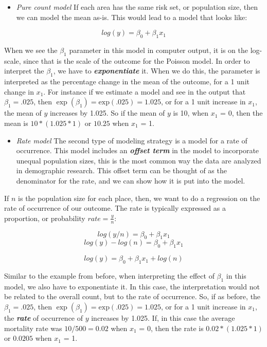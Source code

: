 \documentclass[
]{article}
\providecommand{\tightlist}{%
  \setlength{\itemsep}{0pt}\setlength{\parskip}{0pt}}
\begin{document}
\begin{itemize}
\tightlist
\item
  \emph{Pure count model} If each area has the same risk set, or population size, then we can model the mean as-is. This would lead to a model that looks like:
\end{itemize}

\[log(y)= \beta_0 + \beta_1 x_1\]

When we see the \(\beta_1\) parameter in this model in computer output, it is on the log-scale, since that is the scale of the outcome for the Poisson model. In order to interpret the \(\beta_1\), we have to \textbf{\emph{exponentiate}} it. When we do this, the parameter is interpreted as the percentage change in the mean of the outcome, for a 1 unit change in \(x_1\). For instance if we estimate a model and see in the output that \(\beta_1 = \text{.025}\), then \(\exp(\beta_1) = \text{exp}(\text{.025}) = \text{1.025}\), or for a 1 unit increase in \(x_1\), the mean of \(y\) increases by 1.025. So if the mean of \(y\) is 10, when \(x_1\) = 0, then the mean is \(10*(1.025*1)\) or \(10.25\) when \(x_1\) = 1.

\begin{itemize}
\tightlist
\item
  \emph{Rate model} The second type of modeling strategy is a model for a rate of occurrence. This model includes an \textbf{\emph{offset term}} in the model to incorporate unequal population sizes, this is the most common way the data are analyzed in demographic research. This offset term can be thought of as the denominator for the rate, and we can show how it is put into the model.
\end{itemize}

If \(n\) is the population size for each place, then, we want to do a regression on the rate of occurrence of our outcome. The rate is typically expressed as a proportion, or probability \(rate = \frac{y}{n}\):

\[log(y/n)= \beta_0 + \beta_1 x_1\] \[log(y) - log(n)= \beta_0 + \beta_1 x_1\]

\[log(y)= \beta_0 + \beta_1 x_1 + log(n)\]

Similar to the example from before, when interpreting the effect of \(\beta_1\) in this model, we also have to exponentiate it. In this case, the interpretation would not be related to the overall count, but to the rate of occurrence. So, if as before, the \(\beta_1 = \text{.025}\), then \(\exp(\beta_1) = \text{exp}(\text{.025}) = \text{1.025}\), or for a 1 unit increase in \(x_1\), the \textbf{\emph{rate}} of occurrence of \(y\) increases by 1.025. If, in this case the average mortality rate was \(10/500 = 0.02\) when \(x_1\) = 0, then the rate is \(0.02*(1.025*1)\) or \(0.0205\) when \(x_1\) = 1.
\end{document}
